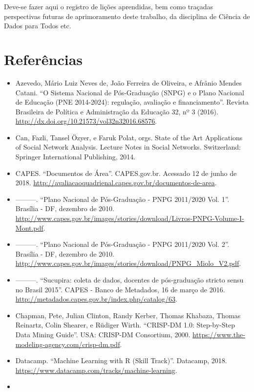 \documentclass[]{article}
\providecommand{\tightlist}{%
  \setlength{\itemsep}{0pt}\setlength{\parskip}{0pt}}
\begin{document}
Deve-se fazer aqui o registro de lições aprendidas, bem como traçadas
perspectivas futuras de aprimoramento deste trabalho, da disciplina de
Ciência de Dados para Todos etc.

\section{Referências}\label{referencias}

\begin{itemize}
\tightlist
\item
  Azevedo, Mário Luiz Neves de, João Ferreira de Oliveira, e Afrânio
  Mendes Catani. ``O Sistema Nacional de Pós-Graduação (SNPG) e o Plano
  Nacional de Educação (PNE 2014-2024): regulação, avaliação e
  financiamento''. Revista Brasileira de Política e Administração da
  Educação 32, nº 3 (2016).
  \url{http://dx.doi.org/10.21573/vol32n32016.68576}.
\item
  Can, Fazli, Tansel Özyer, e Faruk Polat, orgs. State of the Art
  Applications of Social Network Analysis. Lecture Notes in Social
  Networks. Switzerland: Springer International Publishing, 2014.
\item
  CAPES. ``Documentos de Área''. CAPES.gov.br. Acessado 12 de junho de
  2018.
  \url{http://avaliacaoquadrienal.capes.gov.br/documentos-de-area}.
\item
  ---------. ``Plano Nacional de Pós-Graduação - PNPG 2011/2020 Vol.
  1''. Brasília - DF, dezembro de 2010.
  \url{http://www.capes.gov.br/images/stories/download/Livros-PNPG-Volume-I-Mont.pdf}.
\item
  ---------. ``Plano Nacional de Pós-Graduação - PNPG 2011/2020 Vol.
  2''. Brasília - DF, dezembro de 2010.
  \url{http://www.capes.gov.br/images/stories/download/PNPG_Miolo_V2.pdf}.
\item
  ---------. ``Sucupira: coleta de dados, docentes de pós-graduação
  stricto sensu no Brasil 2015''. CAPES - Banco de Metadados, 16 de
  março de 2016.
  \url{http://metadados.capes.gov.br/index.php/catalog/63}.
\item
  Chapman, Pete, Julian Clinton, Randy Kerber, Thomas Khabaza, Thomas
  Reinartz, Colin Shearer, e Rüdiger Wirth. ``CRISP-DM 1.0: Step-by-Step
  Data Mining Guide''. USA: CRISP-DM Consortium, 2000.
  \url{https://www.the-modeling-agency.com/crisp-dm.pdf}.
\item
  Datacamp. ``Machine Learning with R (Skill Track)''. Datacamp, 2018.
  \url{https://www.datacamp.com/tracks/machine-learning}.
\item

\end{itemize}
\end{document}
